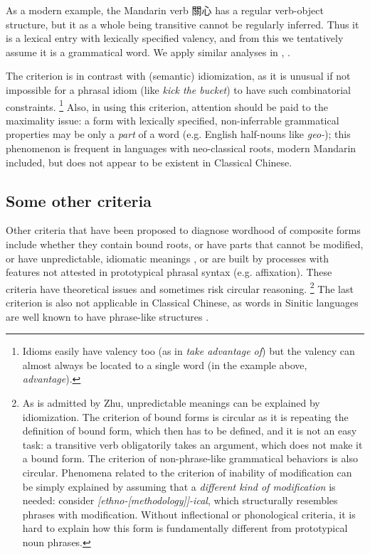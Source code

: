 \documentclass[UTF8, a4paper, oneside, scheme=plain, 12pt]{ctexrep}
\newcommand*{\citepage}[1]{p.~{#1}}
\newcommand*{\citepages}[1]{pp.~{#1}}
\newcommand{\form}[1]{\emph{#1}}
\begin{document}
As a modern example, the Mandarin verb 關心 has a regular verb-object structure, but it as a whole being transitive cannot be regularly inferred.
Thus it is a lexical entry with lexically specified valency,
and from this we tentatively assume it is a grammatical word. 
We apply similar analyses in , .

The criterion is in contrast with (semantic) idiomization, as it is unusual if not impossible for a phrasal idiom (like \form{kick the bucket}) to have such combinatorial constraints.%
\footnote{
    Idioms easily have valency too (as in \form{take advantage of}) but the valency can almost always be located to a single word (in the example above, \form{advantage}).
}
Also, in using this criterion, attention should be paid to the maximality issue:
a form with lexically specified, non-inferrable grammatical properties may be only a \emph{part} of a word (e.g. English half-nouns like \form{geo-});
this phenomenon is frequent in languages with neo-classical roots, modern Mandarin included,
but does not appear to be existent in Classical Chinese.

\subsection{Some other criteria}\label{sec:grammatical.morphology.unreliable}

Other criteria that have been proposed to diagnose wordhood of composite forms include whether they contain bound roots,
or have parts that cannot be modified, or have unpredictable, idiomatic meanings \citep[\citepages{41-43}]{zhudexigrammar},
or are built by processes with features not attested in prototypical phrasal syntax (e.g. affixation). 
These criteria have theoretical issues and sometimes risk circular reasoning.%
\footnote{
    As is admitted by Zhu, unpredictable meanings can be explained by idiomization.
    The criterion of bound forms is circular as it is repeating the definition of bound form,
    which then has to be defined, and it is not an easy task:
    a transitive verb obligatorily takes an argument, which does not make it a bound form.
    The criterion of non-phrase-like grammatical behaviors is also circular. 
    Phenomena related to the criterion of inability of modification can be simply explained by assuming that a \emph{different kind of modification} is needed:
    consider \form{[ethno-[methodology]]-ical}, which structurally resembles phrases with modification.
    Without inflectional or phonological criteria,
    it is hard to explain how this form is fundamentally different from prototypical noun phrases.
}
The last criterion is also not applicable in Classical Chinese,
as words in Sinitic languages are well known to have phrase-like structures
\citep[\citepage{41}]{zhudexigrammar}.
\end{document}
